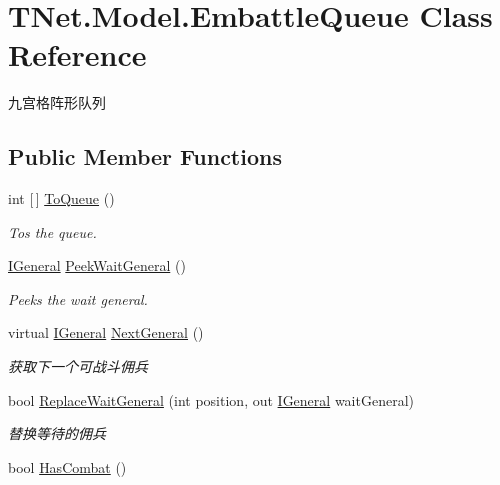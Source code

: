 \hypertarget{class_t_net_1_1_model_1_1_embattle_queue}{}\section{T\+Net.\+Model.\+Embattle\+Queue Class Reference}
\label{class_t_net_1_1_model_1_1_embattle_queue}


九宫格阵形队列  


\subsection*{Public Member Functions}
\begin{DoxyCompactItemize}
\item 
int \mbox{[}$\,$\mbox{]} \mbox{\hyperlink{class_t_net_1_1_model_1_1_embattle_queue_a99080e1068b529b10c5f699665ec2562}{To\+Queue}} ()
\begin{DoxyCompactList}\small\item\em Tos the queue. \end{DoxyCompactList}\item 
\mbox{\hyperlink{interface_t_net_1_1_model_1_1_i_general}{I\+General}} \mbox{\hyperlink{class_t_net_1_1_model_1_1_embattle_queue_adbf3033c32a41df56da9fae493d2bca9}{Peek\+Wait\+General}} ()
\begin{DoxyCompactList}\small\item\em Peeks the wait general. \end{DoxyCompactList}\item 
virtual \mbox{\hyperlink{interface_t_net_1_1_model_1_1_i_general}{I\+General}} \mbox{\hyperlink{class_t_net_1_1_model_1_1_embattle_queue_a60c381ac8a0bcaf18f01c69e01e8b171}{Next\+General}} ()
\begin{DoxyCompactList}\small\item\em 获取下一个可战斗佣兵 \end{DoxyCompactList}\item 
bool \mbox{\hyperlink{class_t_net_1_1_model_1_1_embattle_queue_a90e2405c7747f5763e3710a265bd8f3f}{Replace\+Wait\+General}} (int position, out \mbox{\hyperlink{interface_t_net_1_1_model_1_1_i_general}{I\+General}} wait\+General)
\begin{DoxyCompactList}\small\item\em 替换等待的佣兵 \end{DoxyCompactList}\item 
bool \mbox{\hyperlink{class_t_net_1_1_model_1_1_embattle_queue_a151f22a8eccfe84fd102fb37329605f7}{Has\+Combat}} ()

\end{DoxyCompactItemize}
